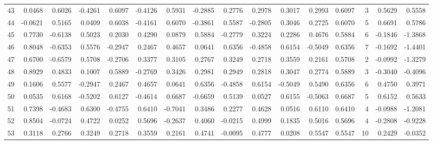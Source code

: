 \begin{tabular}{lrrrrrrrrrrrrrrr}
43  &      0.0468 &  0.6026 & -0.4261 &  0.6097 & -0.4126 &  0.5931 & -0.2885 &  0.2776 &  0.2978 &  0.3017 &   0.2993 &     0.6097 &      3 &                    0.5629 &                     0.5558 \\
44  &     -0.0621 &  0.5165 &  0.0409 &  0.6038 & -0.4161 &  0.6070 & -0.3861 &  0.5587 & -0.2805 &  0.3046 &   0.2725 &     0.6070 &      5 &                    0.6691 &                     0.5786 \\
45  &      0.7730 & -0.6138 &  0.5023 &  0.2030 &  0.4290 &  0.0879 &  0.5884 & -0.2779 &  0.3224 &  0.2286 &   0.4676 &     0.5884 &      6 &                   -0.1846 &                    -1.3868 \\
46  &      0.8048 & -0.6353 &  0.5576 & -0.2947 &  0.2467 &  0.4657 &  0.0641 &  0.6356 & -0.4858 &  0.6154 &  -0.5049 &     0.6356 &      7 &                   -0.1692 &                    -1.4401 \\
47  &      0.6700 & -0.6579 &  0.5708 & -0.2706 &  0.3377 &  0.3105 &  0.2767 &  0.3249 &  0.2718 &  0.3559 &   0.2161 &     0.5708 &      2 &                   -0.0992 &                    -1.3279 \\
48  &      0.8929 &  0.4833 &  0.1007 &  0.5889 & -0.2769 &  0.3426 &  0.2981 &  0.2949 &  0.2818 &  0.3047 &   0.2774 &     0.5889 &      3 &                   -0.3040 &                    -0.4096 \\
49  &      0.1606 &  0.5577 & -0.2947 &  0.2467 &  0.4657 &  0.0641 &  0.6356 & -0.4858 &  0.6154 & -0.5049 &   0.5490 &     0.6356 &      6 &                    0.4750 &                     0.3971 \\
50  &      0.0535 &  0.6168 & -0.5202 &  0.6127 & -0.4614 &  0.6687 & -0.6659 &  0.5139 &  0.0527 &  0.6155 &  -0.5063 &     0.6687 &      5 &                    0.6152 &                     0.5633 \\
51  &      0.7398 & -0.4683 &  0.6300 & -0.4755 &  0.6410 & -0.7041 &  0.3486 &  0.2277 &  0.4628 &  0.0516 &   0.6110 &     0.6410 &      4 &                   -0.0988 &                    -1.2081 \\
52  &      0.8504 & -0.0724 &  0.4722 &  0.0252 &  0.5696 & -0.2637 &  0.4060 & -0.0215 &  0.4999 &  0.1835 &   0.5016 &     0.5696 &      4 &                   -0.2808 &                    -0.9228 \\
53  &      0.3118 &  0.2766 &  0.3249 &  0.2718 &  0.3559 &  0.2161 &  0.4741 & -0.0095 &  0.4777 &  0.0208 &   0.5547 &     0.5547 &     10 &                    0.2429 &                    -0.0352 \\

\end{tabular}
